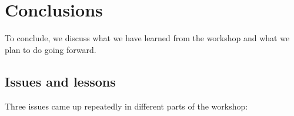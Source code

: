 \documentclass[11pt, oneside]{amsart}
\newcommand{\todo}[1]{{\color{blue}$\blacksquare$~\textsf{[TODO: #1]}}}
\newcommand{\note}[1]{ {\textcolor{red}    { #1 }}}
\begin{document}


\section{Conclusions} \label{sec:conclusions}

To conclude, we discuss what we have learned from the workshop and what we plan to do going forward.


%



\subsection{Issues and lessons}


Three issues came up repeatedly in different parts of the workshop:
\end{document}
